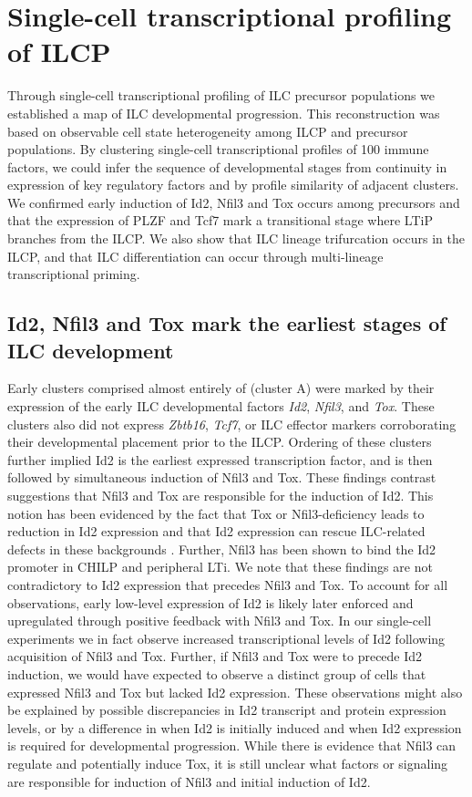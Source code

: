 \section{Single-cell transcriptional profiling of ILCP}

Through single-cell transcriptional profiling of ILC precursor populations we established a map of ILC developmental progression. This reconstruction was based on observable cell state heterogeneity among ILCP and \aLP precursor populations. By clustering single-cell transcriptional profiles of 100 immune factors, we could infer the sequence of developmental stages from continuity in expression of key regulatory factors and by profile similarity of adjacent clusters. We confirmed early induction of Id2, Nfil3 and Tox occurs among \aLP precursors and that the expression of PLZF and Tcf7 mark a transitional stage where LTiP branches from the ILCP. We also show that ILC lineage trifurcation occurs in the ILCP, and that ILC differentiation can occur through multi-lineage transcriptional priming. 

\subsection{Id2, Nfil3 and Tox mark the earliest stages of ILC development}

Early clusters comprised almost entirely of \aLP (cluster A) were marked by their expression of the early ILC developmental factors \textit{Id2}, \textit{Nfil3}, and \textit{Tox}. These clusters also did not express \textit{Zbtb16}, \textit{Tcf7}, or ILC effector markers corroborating their developmental placement prior to the ILCP. Ordering of these clusters further implied Id2 is the earliest expressed transcription factor, and is then followed by simultaneous induction of Nfil3 and Tox. These findings contrast suggestions that Nfil3 and Tox are responsible for the induction of Id2. This notion has been evidenced by the fact that Tox or Nfil3-deficiency leads to reduction in Id2 expression and that Id2 expression can rescue ILC-related defects in these backgrounds \cite{aliahmad2010,aliahmad2011,xu2015,male2014}. Further, Nfil3 has been shown to bind the Id2 promoter in CHILP and peripheral LTi. We note that these findings are not contradictory to Id2 expression that precedes Nfil3 and Tox. To account for all observations, early low-level expression of Id2 is likely later enforced and upregulated through positive feedback with Nfil3 and Tox. In our single-cell experiments we in fact observe increased transcriptional levels of Id2 following acquisition of Nfil3 and Tox. Further, if Nfil3 and Tox were to precede Id2 induction, we would have expected to observe a distinct group of cells that expressed Nfil3 and Tox but lacked Id2 expression. These observations might also be explained by possible discrepancies in Id2 transcript and protein expression levels, or by a difference in when Id2 is initially induced and when Id2 expression is required for developmental progression. While there is evidence that Nfil3 can regulate and potentially induce Tox, it is still unclear what factors or signaling are responsible for induction of Nfil3 and initial induction of Id2.


